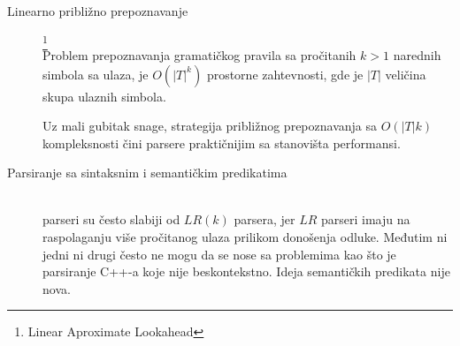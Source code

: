 \begin{description}

	\item[Linearno približno prepoznavanje]\footnote{\eng Linear Aproximate Lookahead} \hfill \\
	Problem prepoznavanja gramatičkog pravila sa pročitanih $k > 1$ narednih simbola sa ulaza, je $O(|T|^{k})$ prostorne zahtevnosti, gde je $|T|$ veličina skupa ulaznih simbola. 
	
	Uz mali gubitak snage, strategija približnog prepoznavanja sa $O(|T|k)$ kompleksnosti čini \LLk parsere praktičnijim sa stanovišta performansi.
	\item[Parsiranje sa sintaksnim i semantičkim predikatima] \hfill \\
	\LLk parseri su često slabiji od $LR(k)$ parsera, jer $LR$ parseri imaju na raspolaganju više pročitanog ulaza prilikom donošenja odluke. Međutim ni jedni ni drugi često ne mogu da se nose sa problemima kao što je parsiranje C++-a koje nije beskontekstno. Ideja semantičkih predikata nije nova\cite{attributed-transations}.




\end{description}
